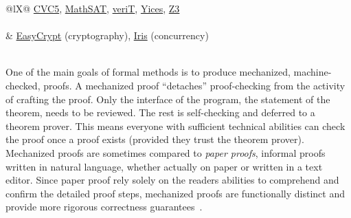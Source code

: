 \begin{table}[p!]
\begin{tabularx}{\linewidth}{@{}lX@{}}
{    \href{https://cvc5.github.io}{CVC5},
    \href{https://mathsat.fbk.eu}{MathSAT},
    \href{https://verit.loria.fr}{veriT},
    \href{https://yices.csl.sri.com}{Yices},
    \href{https://github.com/Z3Prover/z3}{Z3}}
\\
\midrule
{} \\
&
    \href{https://github.com/EasyCrypt/easycrypt}{EasyCrypt} (cryptography),
    \href{https://iris-project.org/}{Iris} (concurrency)
\\
\midrule
{}
\\
\bottomrule
\caption[Tools for formal methods]{%
A collection of formal methods tools.
The categorization is somewhat rough because some tools fit multiple categories.
The list is a limited sample, but with more prominent tools to improve its usefulness.}
\label{tab:fm-tools}
\end{tabularx}
\end{table}

One of the main goals of formal methods is to produce mechanized, \ie machine-checked, proofs.
A mechanized proof \enquote{detaches} proof-checking from the activity of crafting the proof.
Only the interface of the program, \ie the statement of the theorem, needs to be reviewed.
The rest is self-checking and deferred to a theorem prover.
This means everyone with sufficient technical abilities can check the proof once a proof exists (provided they trust the theorem prover).
Mechanized proofs are sometimes compared to \emph{paper proofs}, \ie informal proofs written in natural language, whether actually on paper or written in a text editor.
Since paper proof rely solely on the readers abilities to comprehend and confirm the detailed proof steps, mechanized proofs are functionally distinct and provide more rigorous correctness guarantees~\cite{gonthier2008}.

